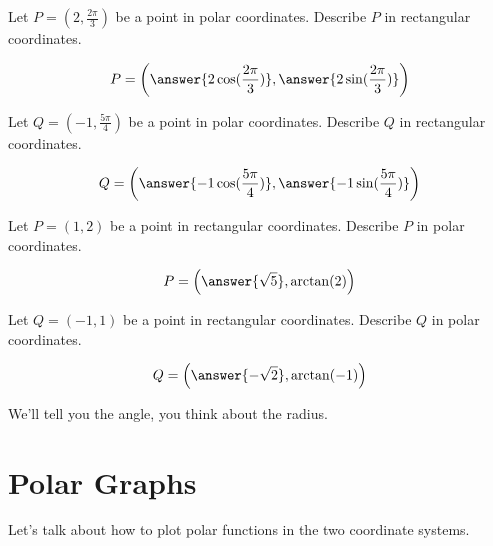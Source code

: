 \documentclass{ximera}
\begin{document}
\begin{question}
  Let $P=\left( 2,\frac{2\pi}{3} \right)$ be a point in polar coordinates. Describe $P$ in
  rectangular coordinates.
  \begin{prompt}
    \[
    P = \left( \answer{2\cos(\frac{2\pi}{3})}, \answer{2\sin(\frac{2\pi}{3})} \right)
    \]
  \end{prompt}
  \begin{question}
  Let $Q=(-1,\frac{5\pi}{4})$ be a point in polar coordinates. Describe $Q$ in
  rectangular coordinates.
  \begin{prompt}
    \[
    Q = \left( \answer{-1\cos(\frac{5\pi}{4})}, \answer{-1\sin(\frac{5\pi}{4})} \right)
    \]
  \end{prompt}
\end{question}
\end{question}

\begin{question}
  Let $P=(1,2)$ be a point in rectangular coordinates. Describe $P$ in
  polar coordinates.
  \begin{prompt}
    \[
    P = \left( \answer{\sqrt{5}}, \arctan(2) \right)
    \]
  \end{prompt}
  \begin{question}
  Let $Q=(-1,1)$ be a point in rectangular coordinates. Describe $Q$ in
  polar coordinates.
  \begin{prompt}
    \[
    Q = \left( \answer{-\sqrt{2}}, \arctan(-1) \right)
    \]
    \begin{hint}
      We'll tell you the angle, you think about the radius.
    \end{hint}
  \end{prompt}
\end{question}
\end{question}


















\section{Polar Graphs}

Let's talk about how to plot polar functions in the two coordinate systems.  \\
\end{document}
